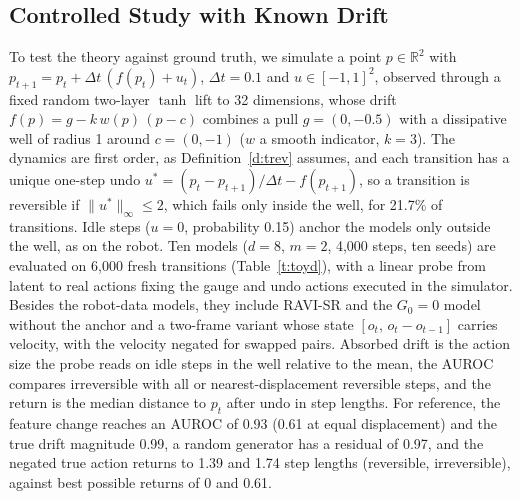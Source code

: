 \documentclass{jcse}
\newcommand{\method}{RAVI}
\newcommand{\R}{\mathbb{R}}
\begin{document}
\subsection{Controlled Study with Known Drift} \label{s:toy}
To test the theory against ground truth, we simulate a point $p\in\R^2$ with $p_{t+1}=p_t+\Delta t\,(f(p_t)+u_t)$, $\Delta t=0.1$ and $u\in[-1,1]^2$, observed through a fixed random two-layer $\tanh$ lift to 32 dimensions, whose drift $f(p)=g-k\,w(p)\,(p-c)$ combines a pull $g=(0,-0.5)$ with a dissipative well of radius 1 around $c=(0,-1)$ ($w$ a smooth indicator, $k=3$).
The dynamics are first order, as Definition~\ref{d:trev} assumes, and each transition has a unique one-step undo $u^*=(p_t-p_{t+1})/\Delta t-f(p_{t+1})$, so a transition is reversible if $\|u^*\|_\infty\le2$, which fails only inside the well, for 21.7\% of transitions.
Idle steps ($u=0$, probability 0.15) anchor the models only outside the well, as on the robot.
Ten models ($d=8$, $m=2$, 4,000 steps, ten seeds) are evaluated on 6,000 fresh transitions (Table~\ref{t:toyd}), with a linear probe from latent to real actions fixing the gauge and undo actions executed in the simulator. Besides the robot-data models, they include {\method}-SR and the $G_0=0$ model without the anchor and a two-frame variant whose state $[o_t,\,o_t-o_{t-1}]$ carries velocity, with the velocity negated for swapped pairs.
Absorbed drift is the action size the probe reads on idle steps in the well relative to the mean, the AUROC compares irreversible with all or nearest-displacement reversible steps, and the return is the median distance to $p_t$ after undo in step lengths.
For reference, the feature change reaches an AUROC of 0.93 (0.61 at equal displacement) and the true drift magnitude 0.99, a random generator has a residual of 0.97, and the negated true action returns to 1.39 and 1.74 step lengths (reversible, irreversible), against best possible returns of 0 and 0.61.
\end{document}
